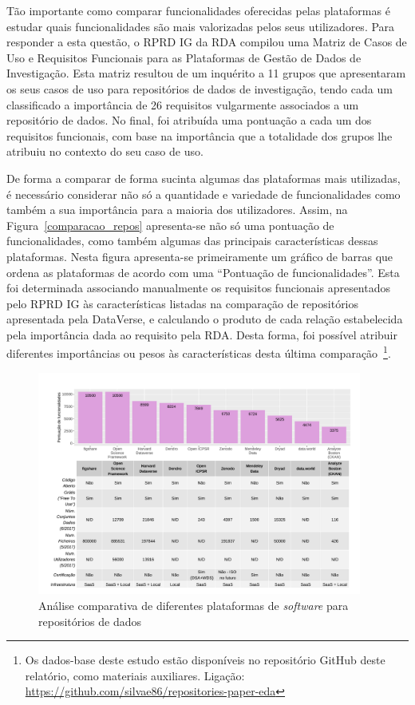 \documentclass[sigconf,nonacm]{acmart}
\begin{document}
Tão importante como comparar funcionalidades oferecidas pelas plataformas é estudar quais funcionalidades são mais valorizadas pelos seus utilizadores. Para responder a esta questão, o \gls{RPRD IG} da \gls{RDA} compilou uma Matriz de Casos de Uso e Requisitos Funcionais para as Plataformas de Gestão de Dados de Investigação. Esta matriz resultou de um inquérito a 11 grupos que apresentaram os seus casos de uso para repositórios de dados de investigação, tendo cada um classificado a importância de 26 requisitos vulgarmente associados a um repositório de dados. No final, foi atribuída uma pontuação a cada um dos requisitos funcionais, com base na importância que a totalidade dos grupos lhe atribuiu no contexto do seu caso de uso.

De forma a comparar de forma sucinta algumas das plataformas mais utilizadas, é necessário considerar não só a quantidade e variedade de funcionalidades como também a sua importância para a maioria dos utilizadores. Assim, na Figura~\ref{comparacao_repos} apresenta-se não só uma pontuação de funcionalidades, como também algumas das principais características dessas plataformas. Nesta figura apresenta-se primeiramente um gráfico de barras que ordena as plataformas de acordo com uma ``Pontuação de funcionalidades''. Esta foi determinada associando manualmente os requisitos funcionais apresentados pelo \gls{RPRD IG} às características listadas na comparação de repositórios apresentada pela DataVerse, e calculando o produto de cada relação estabelecida pela importância dada ao requisito pela \gls{RDA}. Desta forma, foi possível atribuir diferentes importâncias ou pesos às características desta última comparação~\footnote{Os dados-base deste estudo estão disponíveis no repositório GitHub deste relatório, como materiais auxiliares. Ligação: \url{https://github.com/silvae86/repositories-paper-eda}}.

\begin{figure}[h!t!]
\centering
\includegraphics[width=0.95\textwidth]{Sources/DataverseComparativeReview/plot.pdf}
\caption{Análise comparativa de diferentes plataformas de \emph{software} para repositórios de dados}
\end{figure}
\end{document}
